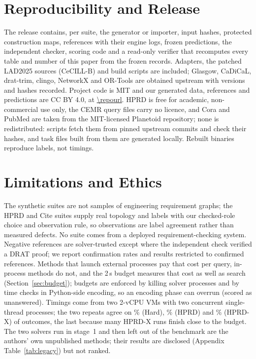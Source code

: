 \section{Reproducibility and Release}
The release contains, per suite, the generator or importer, input hashes, protected construction maps, references with their engine logs, frozen predictions, the independent checker, scoring code and a read-only verifier that recomputes every table and number of this paper from the frozen records. Adapters, the patched LAD2025 sources (CeCILL-B) and build scripts are included; Glasgow, CaDiCaL, drat-trim, clingo, NetworkX and OR-Tools are obtained upstream with versions and hashes recorded. Project code is MIT and our generated data, references and predictions are CC BY 4.0, at \url{\repourl}. HPRD is free for academic, non-commercial use only, the CEMR query files carry no licence, and Cora and PubMed are taken from the MIT-licensed Planetoid repository; none is redistributed: scripts fetch them from pinned upstream commits and check their hashes, and task files built from them are generated locally. Rebuilt binaries reproduce labels, not timings.

\section{Limitations and Ethics}
\label{sec:limits}
The synthetic suites are not samples of engineering requirement graphs; the HPRD and Cite suites supply real topology and labels with our checked-role choice and observation rule, so observations are label agreement rather than measured defects. No suite comes from a deployed requirement-checking system. Negative references are solver-trusted except where the independent check verified a DRAT proof; we report confirmation rates and results restricted to confirmed references. Methods that launch external processes pay that cost per query, in-process methods do not, and the 2\,s budget measures that cost as well as search (Section~\ref{sec:budget}); budgets are enforced by killing solver processes and by time checks in Python-side encoding, so an encoding phase can overrun (scored as unanswered). Timings come from two 2-vCPU VMs with two concurrent single-thread processes; the two repeats agree on \hardRepeatAgreePct\% (Hard), \hprdRepeatAgreePct\% (HPRD) and \hprdxRepeatAgreePct\% (HPRD-X) of outcomes, the last because many HPRD-X runs finish close to the budget. The two solvers run in stage~1 and then left out of the benchmark are the authors' own unpublished methods; their results are disclosed (Appendix Table~\ref{tab:legacy}) but not ranked.

